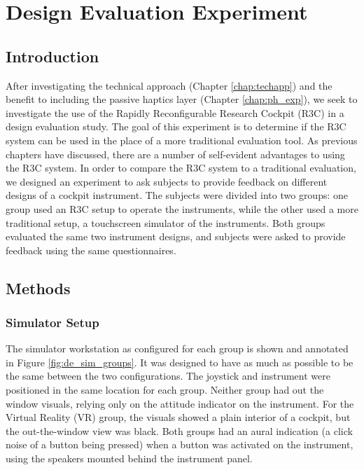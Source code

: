 \chapter{Design Evaluation Experiment}
\label{chap:de_exp}

\section{Introduction}

After investigating the technical approach (Chapter \autoref{chap:techapp}) and the benefit to including the passive haptics layer (Chapter \autoref{chap:ph_exp}), we seek to investigate the use of the Rapidly Reconfigurable Research Cockpit (R3C) in a design evaluation study.
The goal of this experiment is to determine if the R3C system can be used in the place of a more traditional evaluation tool.
As previous chapters have discussed, there are a number of self-evident advantages to using the R3C system.
In order to compare the R3C system to a traditional evaluation, we designed an experiment to ask subjects to provide feedback on different designs of a cockpit instrument.
The subjects were divided into two groups: one group used an R3C setup to operate the instruments, while the other used a more traditional setup, a touchscreen simulator of the instruments.
Both groups evaluated the same two instrument designs, and subjects were asked to provide feedback using the same questionnaires.


\section{Methods}


\subsection{Simulator Setup}

The simulator workstation as configured for each group is shown and annotated in Figure \ref{fig:de_sim_groups}.
It was designed to have as much as possible to be the same between the two configurations.
The joystick and instrument were positioned in the same location for each group.
Neither group had out the window visuals, relying only on the attitude indicator on the instrument.
For the Virtual Reality (VR) group, the visuals showed a plain interior of a cockpit, but the out-the-window view was black.
Both groups had an aural indication (a click noise of a button being pressed) when a button was activated on the instrument, using the speakers mounted behind the instrument panel.

